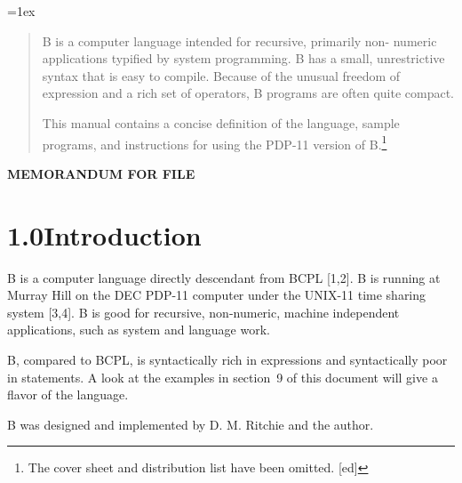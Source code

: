 \documentclass[12pt]{report}
\begin{document}
\parindent=0cm
\parskip=1ex

\newcommand{\f}[1]{\ensuremath{\mathit{#1}}}


\newcommand{\sect}[2]{\section*{\large{#1\hspace{0.5em}#2}}}
\newcommand{\token}[1]{\texttt{\underline{#1}}}

\begin{abstract}
  B is a computer language intended for recursive, primarily non-
  numeric applications typified by system programming. B has a small,
  unrestrictive syntax that is easy to compile. Because of the unusual
  freedom of expression and a rich set of operators, B programs are
  often quite compact.

  This manual contains a concise definition of the language, sample
  programs, and instructions for using the PDP-11 version of
  B.\footnote{The cover sheet and distribution list have been omitted. [ed]}
\end{abstract}

\newpage

\begin{center}
  \large\textbf{MEMORANDUM FOR FILE}
\end{center}

\sect{1.0}{Introduction}

B is a computer language directly descendant from BCPL [1,2].  B is
running at Murray Hill on the DEC PDP-11 computer under the UNIX-11
time sharing system [3,4]. B is good for recursive, non-numeric,
machine independent applications, such as system and language work.

B, compared to BCPL, is syntactically rich in expressions and
syntactically poor in statements. A look at the examples in section~9
of this document will give a flavor of the language.

B was designed and implemented by D. M. Ritchie and the author.
\end{document}

